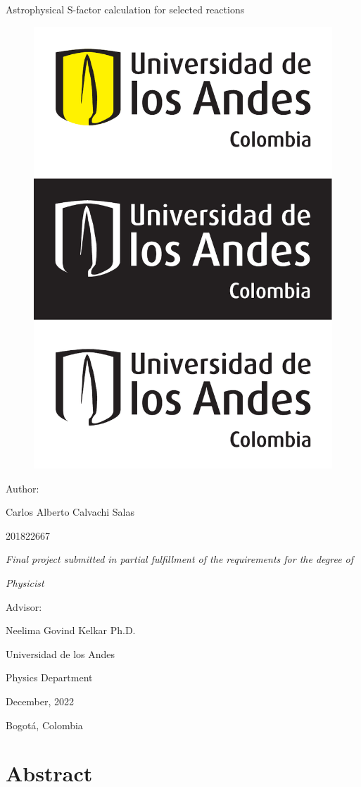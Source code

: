 \documentclass[openany]{book}
\begin{document}
	


		\begin{titlepage}
		\centering
		
		{\Huge Astrophysical S-factor calculation for selected reactions  \par}
		
		\begin{figure}[H]
			\centering
			\includegraphics[width=0.5\linewidth]{logo.pdf}
			\label{fig:logo}
		\end{figure}
		{\Large Author:  \par}
		{\Large Carlos Alberto Calvachi Salas \par}
		{\Large 201822667 \par}
		\vfill
		{\Large\textit{Final project submitted in partial fulfillment of the requirements for the degree of} \par}
		\vfill
		{\Large\textit{Physicist} \par}
		\vfill
		{\Large Advisor:  \par}
		{\Large Neelima Govind Kelkar Ph.D. \par}
		\vfill
		{\Large Universidad de los Andes  \par}
		{\Large Physics Department  \par}
		{\Large December, 2022  \par}
		{\Large Bogotá, Colombia \par}
	\end{titlepage}

\chapter*{Abstract}
\end{document}
